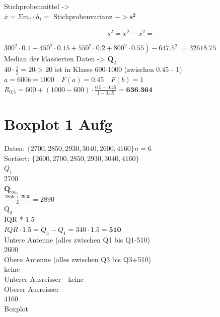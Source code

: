 \documentclass[10pt]{article}
\begin{document}
{Stichprobenmittel ->\\
$\bar{x}=\Sigma m_{i} \cdot h_{i}=$ Stichprobenvarianz $\boldsymbol{- >} \boldsymbol{s}^{\mathbf{2}}$

$$
s^{2}=\overline{x^{2}}-\bar{x}^{2}=
$$

$\left.300^{2} \cdot 0.1+450^{2} \cdot 0.15+550^{2} \cdot 0.2+800^{2} \cdot 0.55\right)-647.5^{2}$ $=32618.75$\\
Median der klassierten Daten -> $\boldsymbol{Q}_{2}$\\
$40 \cdot \frac{1}{2}=20$-> 20 ist in Klasse 600-1000 (zwischen 0.45 - 1) $a=600 b=1000 \quad F(a)=0.45 \quad F(b)=1$\\
$R_{0.5}=600+(1000-600) \cdot \frac{0.5-0.45}{1-0.45}=\mathbf{6 3 6 . 3 6 4}$

\section*{Boxplot 1 Aufg}
Daten: $\{2700,2850,2930,3040,2600,4160\} n=6$\\
Sortiert: $\{2600,2700,2850,2930,3040,4160\}$\\
$Q_{1}$\\
2700\\
$\mathbf{Q}_{285}$\\
$\frac{2850+2930}{2}=2890$\\
$\mathrm{Q}_{3}$\\
IQR * 1.5\\
$I Q R \cdot 1.5=Q_{3}-Q_{1}=340 \cdot 1.5=\mathbf{5 1 0}$\\
Untere Antenne (alles zwischen Q1 bis Q1-510)\\
2600\\
Obere Antenne (alles zwischen Q3 bis Q3+510)\\
keine\\
Unterer Ausreisser - keine\\
Oberer Ausreisser\\
4160\\
Boxplot\\
}
\end{document}
